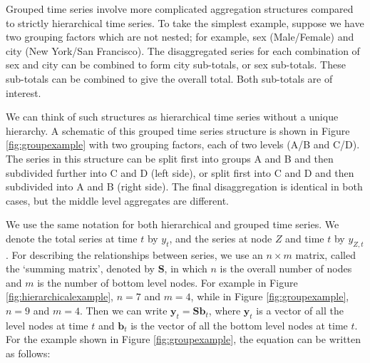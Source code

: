 \documentclass[11pt,a4paper,]{article}
\begin{document}
Grouped time series involve more complicated aggregation structures
compared to strictly hierarchical time series. To take the simplest
example, suppose we have two grouping factors which are not nested; for
example, sex (Male/Female) and city (New York/San Francisco). The
disaggregated series for each combination of sex and city can be
combined to form city sub-totals, or sex sub-totals. These sub-totals
can be combined to give the overall total. Both sub-totals are of
interest.

We can think of such structures as hierarchical time series without a
unique hierarchy. A schematic of this grouped time series structure is
shown in Figure \ref{fig:groupexample} with two grouping factors, each
of two levels (A/B and C/D). The series in this structure can be split
first into groups A and B and then subdivided further into C and D (left
side), or split first into C and D and then subdivided into A and B
(right side). The final disaggregation is identical in both cases, but
the middle level aggregates are different.

We use the same notation \autocite[following][]{fpp2} for both
hierarchical and grouped time series. We denote the total series at time
\(t\) by \(y_t\), and the series at node \(Z\) and time \(t\) by
\(y_{Z,t}\). For describing the relationships between series, we use an
\(n\times m\) matrix, called the `summing matrix', denoted by
\(\bm{S}\), in which \(n\) is the overall number of nodes and \(m\) is
the number of bottom level nodes. For example in Figure
\ref{fig:hierarchicalexample}, \(n = 7\) and \(m = 4\), while in Figure
\ref{fig:groupexample}, \(n=9\) and \(m=4\). Then we can write
\(\bm{y}_t=\bm{S}\bm{b}_t\), where \(\bm{y}_t\) is a vector of all the
level nodes at time \(t\) and \(\bm{b}_t\) is the vector of all the
bottom level nodes at time \(t\). For the example shown in Figure
\ref{fig:groupexample}, the equation can be written as follows:
\end{document}
